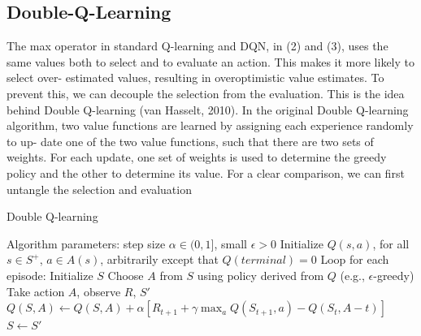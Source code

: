 \documentclass[12pt,a4paper]{article}
\begin{document}
\subsection{Double-Q-Learning}
The max operator in standard Q-learning and DQN, in (2) and (3), uses the same values both to select and to evaluate an action. This makes it more likely to select over- estimated values, resulting in overoptimistic value estimates. To prevent this, we can decouple the selection from the evaluation. This is the idea behind Double Q-learning (van Hasselt, 2010). In the original Double Q-learning algorithm, two value functions are learned by assigning each experience randomly to up- date one of the two value functions, such that there are two sets of weights. For each update, one set of weights is used to determine the greedy policy and the other to determine its value. For a clear comparison, we can first untangle the selection and evaluation
\begin{algorithm}
    \caption{Double Q-learning}
    \begin{algorithmic}
    \State Algorithm parameters: step size $\alpha \in (0, 1]$, small  $\epsilon > 0$
    \State Initialize $Q(s,a)$, for all $s\in S^+$, $a\in A(s)$, arbitrarily except that $Q(terminal)=0$
    \State Loop for each episode:
        \State Initialize $S$
            \State Choose $A$ from $S$ using policy derived from $Q$ (e.g., $\epsilon$-greedy)
            \State Take action $A$, observe $R$, $S'$
            \State $Q(S, A) \leftarrow Q(S, A) + \alpha [R_{t+1}+\gamma \max_aQ(S_{t+1},a)-Q(S_t,A-t)]$
            \State $S \leftarrow S'$
        \EndFor
    \EndWhile
    \end{algorithmic}
\end{algorithm}
\end{document}
